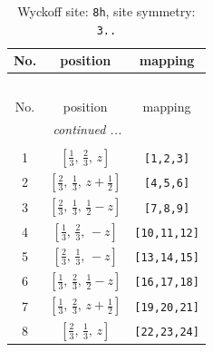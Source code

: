 \documentclass[fleqn,8pt]{jsarticle}
\begin{document}
\begin{longtable}{ccc}
\caption{Wyckoff site: {\tt 8h}, site symmetry: {\tt 3..}}
 \\
 \hline \hline
No. & position & mapping \\ \hline \endfirsthead

\multicolumn{2}{l}{\tablename\ \thetable{}} \\
 \hline \hline
No. & position & mapping \\ \hline \endhead

 \hline \hline
\multicolumn{2}{r}{\footnotesize\it continued ...} \\ \endfoot

 \hline \hline
\multicolumn{2}{r}{} \\ \endlastfoot

1 & $\left[ \frac{1}{3},\, \frac{2}{3},\, z \right]$ & {\tt [1,2,3]} \\ \hline
2 & $\left[ \frac{2}{3},\, \frac{1}{3},\, z + \frac{1}{2} \right]$ & {\tt [4,5,6]} \\ \hline
3 & $\left[ \frac{2}{3},\, \frac{1}{3},\, \frac{1}{2} - z \right]$ & {\tt [7,8,9]} \\ \hline
4 & $\left[ \frac{1}{3},\, \frac{2}{3},\, - z \right]$ & {\tt [10,11,12]} \\ \hline
5 & $\left[ \frac{2}{3},\, \frac{1}{3},\, - z \right]$ & {\tt [13,14,15]} \\ \hline
6 & $\left[ \frac{1}{3},\, \frac{2}{3},\, \frac{1}{2} - z \right]$ & {\tt [16,17,18]} \\ \hline
7 & $\left[ \frac{1}{3},\, \frac{2}{3},\, z + \frac{1}{2} \right]$ & {\tt [19,20,21]} \\ \hline
8 & $\left[ \frac{2}{3},\, \frac{1}{3},\, z \right]$ & {\tt [22,23,24]} \\
\end{longtable}
\renewcommand{\arraystretch}{1.2}
\end{document}
